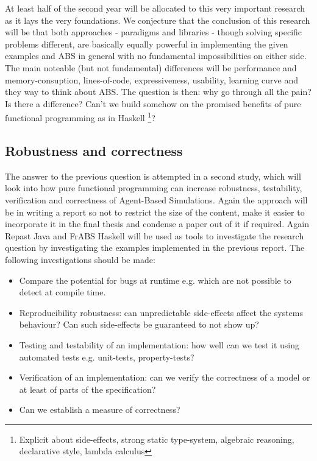 At least half of the second year will be allocated to this very important research as it lays the very foundations. We conjecture that the conclusion of this research will be that both approaches - paradigms and libraries - though solving specific problems different, are basically equally powerful in implementing the given examples and ABS in general with no fundamental impossibilities on either side. The main noteable (but not fundamental) differences will be performance and memory-consuption, lines-of-code, expressiveness, usability, learning curve and they way to think about ABS.
The question is then: why go through all the pain? Is there a difference? Can't we build somehow on the promised benefits of pure functional programming as in Haskell \footnote{Explicit about side-effects, strong static type-system, algebraic reasoning, declarative style, lambda calculus}?

\subsection{Robustness and correctness}
The answer to the previous question is attempted in a second study, which will look into how pure functional programming can increase robustness, testability, verification and correctness of Agent-Based Simulations. Again the approach will be in writing a report so not to restrict the size of the content, make it easier to incorporate it in the final thesis and condense a paper out of it if required.
Again Repast Java and FrABS Haskell will be used as tools to investigate the research question by investigating the examples implemented in the previous report. The following investigations should be made:

\begin{itemize}
	\item Compare the potential for bugs at runtime e.g. which are not possible to detect at compile time. 
	\item Reproducibility robustness: can unpredictable side-effects affect the systems behaviour? Can such side-effects be guaranteed to not show up? 
	\item Testing and testability of an implementation: how well can we test it using automated tests e.g. unit-tests, property-tests?
	\item Verification of an implementation: can we verify the correctness of a model or at least of parts of the specification?
	\item Can we establish a measure of correctness?
\end{itemize}

